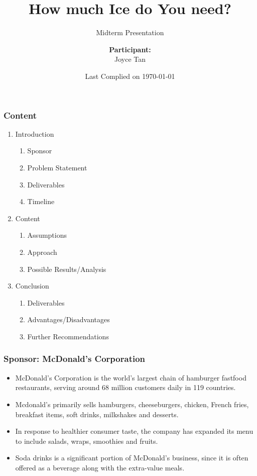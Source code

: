 \documentclass[compress,handout,10pt]{beamer}
\title{{\color{blue} \LARGE How much Ice do You need?\newline} }
\subtitle{{\color{red} \large Midterm Presentation} }
\author{ 
    {\bf{Participant:}} \\ 
Joyce Tan \\ 
    \vspace{5pt}
}
\institute{JHU AMS 2012 FALL}
\date{\mygreen Last Complied on \today}
\let\olditem\item
\renewcommand{\item}{\setlength{\itemsep}{0.5\baselineskip}\olditem}
\begin{document}
\begin{frame}[plain]
    \titlepage
\end{frame}


\begin{frame}
    \frametitle{Content}
    
    \vspace{7pt}
             \begin{enumerate}
                 \item Introduction
 		 \begin{enumerate}
                	 \item Sponsor
		\item Problem Statement
		\item Deliverables
\item Timeline
		\end{enumerate}
                 \item Content
		\begin{enumerate}
\item Assumptions
                	 \item Approach
		\item Possible Results/Analysis
		\end{enumerate}
                 \item Conclusion
		\begin{enumerate}
                	 \item Deliverables
		\item Advantages/Disadvantages
		\item Further Recommendations
		\end{enumerate}
             \end{enumerate}
\end{frame}

\begin{frame}
    \frametitle{Sponsor: McDonald's Corporation}
    \begin{itemize}
        \item McDonald's Corporation is the world's largest chain of hamburger fastfood restaurants, serving around 68 million customers daily in 119 countries. 
	\item Mcdonald's primarily sells hamburgers, cheeseburgers, chicken, French fries, breakfast items, soft drinks, milkshakes and desserts. 
 	\item In response to healthier consumer taste, the company has expanded its menu to include salads, wraps, smoothies and fruits.
	 \item Soda drinks is a significant portion of McDonald's business, since it is often offered as a beverage along with the extra-value meals.
    \end{itemize}
\end{frame}
\end{document}
